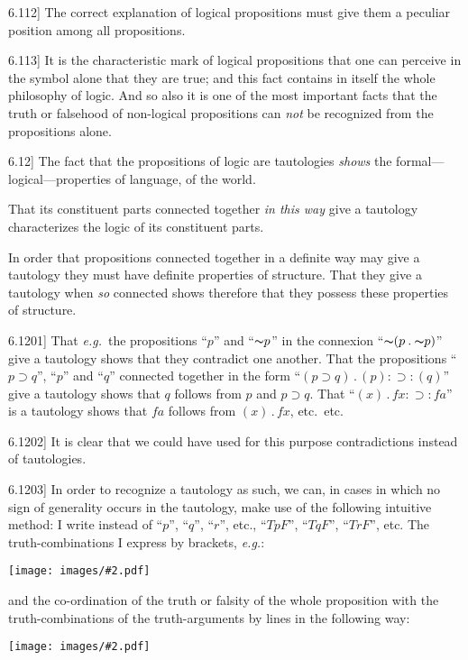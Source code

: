 \documentclass[12pt,oneside]{book}[2007/10/19]
\newcommand{\PropositionE}[2]{%
  \item[\phantomsection\label{PropE:#1}\PropGRef{#1}] #2%
}
\newcommand{\PropGRef}[1]{\hyperref[PropG:#1]{#1}}
\newcommand{\Illustration}[2][0.3\textwidth]{%
  \begin{center}
  \texttt{[image: images/\#2.pdf]}
  \end{center}
}
\newcommand{\Not}[1]{\mathord{\thicksim} #1}
\newcommand{\DotOp}{\mathbin{.}}
\newcommand{\Implies}{\supset}
\newcommand{\exempliGratia}{\textit{e.g.}}
\begin{document}
\begin{propositions}
\PropositionE{6.112}
{The correct explanation of logical propositions
must give them a peculiar position among all
propositions.}


\PropositionE{6.113}
{It is the characteristic mark of logical propositions
that one can perceive in the symbol alone
that they are true; and this fact contains in itself
the whole philosophy of logic. And so also it is
one of the most important facts that the truth or
falsehood of non-logical propositions can \emph{not} be
recognized from the propositions alone.}


\PropositionE{6.12}
{The fact that the propositions of logic are
tautologies \emph{shows} the for\-mal---log\-i\-cal---prop\-er\-ties
of language, of the world.

That its constituent parts connected together \emph{in
this way} give a tautology characterizes the logic of
its constituent parts.

In order that propositions connected together
in a definite way may give a tautology they
must have definite properties of structure. That
they give a tautology when \emph{so} connected shows
therefore that they possess these properties of
structure.}


\PropositionE{6.1201}
{That \exempliGratia\ the propositions ``$p$'' and ``$\Not{p}$'' in
the connexion ``$\Not{(p \DotOp \Not{p})}$'' give a tautology
shows that they contradict one another. That the
propositions ``$p \Implies q$'', ``$p$'' and ``$q$'' connected
together in the form ``$(p \Implies q) \DotOp (p) : \Implies : (q)$'' give a
tautology shows that $q$ follows from $p$ and $p \Implies q$.
That ``$(x) \DotOp fx : \Implies : fa$'' is a tautology shows that
$fa$ follows from $(x) \DotOp fx$, etc.\ etc.}


\PropositionE{6.1202}
{It is clear that we could have used for this
purpose contradictions instead of tautologies.}


\PropositionE{6.1203}
{In order to recognize a tautology as such, we
can, in cases in which no sign of generality occurs
in the tautology, make use of the following intuitive
method: I write instead of ``$p$'', ``$q$'', ``$r$'', etc.,
``$TpF$'', ``$TqF$'', ``$TrF$'', etc. The truth-combinations
I express by brackets, \exempliGratia:
\Illustration[0.35\textwidth]{brackets01-en}
and the co-ordination of the truth or falsity of the
whole proposition with the truth-combinations of
the truth-arguments by lines in the following way:
\Illustration[0.4\textwidth]{brackets02-en}

}
\end{propositions}
\end{document}
